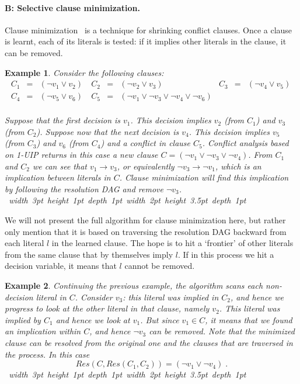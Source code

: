 \documentclass[twoside,11pt]{article}
\newcommand\qed{\hfill\hbox{\hskip 4pt
                \vrule width 3pt height 1pt depth 1pt
                \hbox{\vrule width 2pt height 3.5pt depth 1pt}}}
\newtheorem{example}{Example}
\begin{document}
\paragraph{B:  Selective clause minimization.}
Clause minimization~\cite{BKS04,DBLP:conf/sat/SorenssonB09} is a technique for shrinking conflict clauses. Once a clause is learnt,
each of its literals is tested: if it implies other literals in the clause, it can be removed.

\begin{example}
Consider the following clauses:
\[ \begin{array}{lllllllll}
C_1 &=& ( \lnot v_1 \lor  v_2)\ & C_2 &=& ( \lnot v_2 \lor  v_3)\ & C_3 &=& ( \lnot v_4 \lor  v_5)\ \\
C_4 &=& ( \lnot v_5 \lor  v_6)\ & C_5 &=& ( \lnot v_1 \lor  \lnot v_3 \lor  \lnot v_4 \lor  \lnot v_6)\\
\end{array}
\]

Suppose that the first decision is $v_1$. This decision implies $v_2$ (from $C_1$) and $v_3$ (from $C_2$). Suppose now that the next decision is $v_4$. This decision implies $v_5$ (from $C_3$) and $v_6$ (from $C_4$) and a conflict in clause $C_5$.
  Conflict analysis based on 1-UIP returns in this case a new clause $C = ( \lnot v_1 \lor  \lnot v_3  \lor  \lnot v_4)$. From $C_1$ and $C_2$ we can see that $v_1 \rightarrow v_3$, or equivalently $\lnot v_3 \rightarrow \lnot v_1$, which is an implication between literals in $C$. Clause minimization will find this implication by following the resolution DAG and remove  $\lnot v_3$.
\qed
\end{example}

We will not present the full algorithm for clause minimization here, but rather only mention that it is based on traversing the resolution DAG backward from each literal $l$ in the learned clause. The hope is to hit a `frontier' of other literals from the same clause that by themselves imply $l$. If in this process we hit a decision variable, it means that $l$ cannot be removed.

\begin{example}
Continuing the previous example, the algorithm scans each non-decision literal in $C$. Consider $v_3$: this literal was implied in $C_2$, and hence we progress to look at the other literal in that clause, namely $v_2$. This literal was implied by $C_1$ and hence we look at $v_1$. But since $v_1 \in C$, it means that we found an implication within $C$, and hence $\lnot v_3$ can be removed. Note that the minimized clause can be resolved from the original one and the clauses that are traversed in the process. In this case
\[Res(C, Res(C_1, C_2)) = (\lnot v_1 \lor \lnot v_4)\;.\]
\qed
\end{example}
\end{document}
